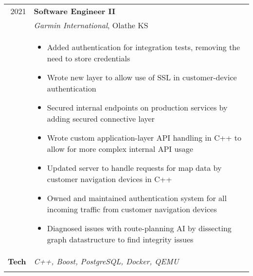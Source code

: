 \documentclass[a4paper,10pt]{article}
\newcommand{\br}{\\\multicolumn{2}{c}{}}
\begin{document}
\begin{tabular}{r|p{15cm}}
  \textsc{2021}  & \textbf{Software Engineer II} \\
                 & \textit{Garmin International}, Olathe KS
  \\ &
       \begin{itemize}
       \item Added authentication for integration tests, removing the need to store credentials
       \item Wrote new layer to allow use of SSL in customer-device authentication
       \item Secured internal endpoints on production services by adding secured connective layer
       \item Wrote custom application-layer API handling in C++ to allow for more complex internal API usage
       \item Updated server to handle requests for map data by customer navigation devices in C++
       \item Owned and maintained authentication system for all incoming traffic from customer navigation devices
       \item Diagnosed issues with route-planning AI by dissecting graph datastructure to find integrity issues
       \end{itemize} \\
  \textbf{Tech} & \textit{C++, Boost, PostgreSQL, Docker, QEMU} \br \\
\end{tabular}
\end{document}
